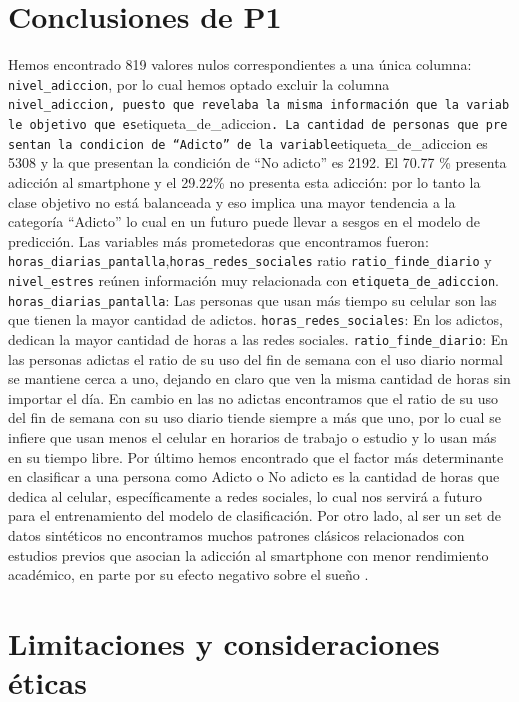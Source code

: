 \documentclass[11pt,spanish,a4paper,]{article}
\begin{document}
\section{Conclusiones de P1}\label{conclusiones-de-p1}

Hemos encontrado 819 valores nulos correspondientes a una única columna:
\texttt{nivel\_adiccion}, por lo cual hemos optado excluir la columna
\texttt{nivel\_adiccion\textasciigrave{}\textasciigrave{},\ puesto\ que\ revelaba\ la\ misma\ información\ que\ la\ variable\ objetivo\ que\ es}etiqueta\_de\_adiccion\texttt{.\ La\ cantidad\ de\ personas\ que\ presentan\ la\ condicion\ de\ “Adicto”\ de\ la\ variable}etiqueta\_de\_adiccion
es 5308 y la que presentan la condición de ``No adicto'' es 2192. El
70.77 \% presenta adicción al smartphone y el 29.22\% no presenta esta
adicción: por lo tanto la clase objetivo no está balanceada y eso
implica una mayor tendencia a la categoría ``Adicto'' lo cual en un
futuro puede llevar a sesgos en el modelo de predicción. Las variables
más prometedoras que encontramos fueron:
\texttt{horas\_diarias\_pantalla},\texttt{horas\_redes\_sociales} ratio
\texttt{ratio\_finde\_diario} y \texttt{nivel\_estres} reúnen
información muy relacionada con \texttt{etiqueta\_de\_adiccion}.
\texttt{horas\_diarias\_pantalla}: Las personas que usan más tiempo su
celular son las que tienen la mayor cantidad de adictos.
\texttt{horas\_redes\_sociales}: En los adictos, dedican la mayor
cantidad de horas a las redes sociales. \texttt{ratio\_finde\_diario}:
En las personas adictas el ratio de su uso del fin de semana con el uso
diario normal se mantiene cerca a uno, dejando en claro que ven la misma
cantidad de horas sin importar el día. En cambio en las no adictas
encontramos que el ratio de su uso del fin de semana con su uso diario
tiende siempre a más que uno, por lo cual se infiere que usan menos el
celular en horarios de trabajo o estudio y lo usan más en su tiempo
libre. Por último hemos encontrado que el factor más determinante en
clasificar a una persona como Adicto o No adicto es la cantidad de horas
que dedica al celular, específicamente a redes sociales, lo cual nos
servirá a futuro para el entrenamiento del modelo de clasificación. Por
otro lado, al ser un set de datos sintéticos no encontramos muchos
patrones clásicos relacionados con estudios previos que asocian la
adicción al smartphone con menor rendimiento académico, en parte por su
efecto negativo sobre el sueño \autocite{rathakrishnan2021smartphone}.

\section{Limitaciones y consideraciones
éticas}\label{limitaciones-y-consideraciones-uxe9ticas}
\end{document}
